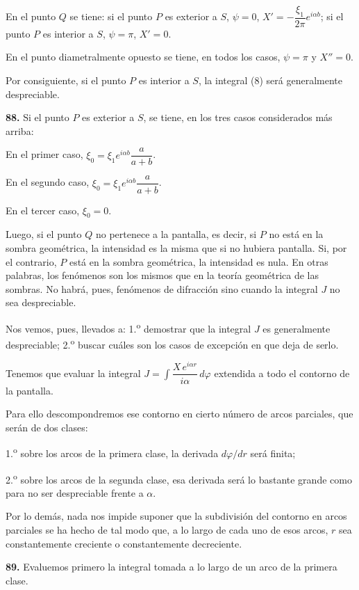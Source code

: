 En el punto $Q$ se tiene: si el punto $P$ es exterior a $S$, $\psi=0$,
$X'=-\dfrac{\xi_1}{2\pi}e^{i\alpha b}$; si el punto $P$ es interior a $S$,
$\psi=\pi$, $X'=0$.

En el punto diametralmente opuesto se tiene, en todos los casos, $\psi=\pi$
y $X''=0$.

Por consiguiente, si el punto $P$ es interior a $S$, la integral (8) será
generalmente despreciable.

\noindent\textbf{88.} Si el punto $P$ es exterior a $S$, se tiene, en los
tres casos considerados más arriba:

En el primer caso, $\xi_0=\xi_1e^{i\alpha b}\dfrac{a}{a+b}$.

En el segundo caso, $\xi_0=\xi_1e^{i\alpha b}\dfrac{a}{a+b}$.

En el tercer caso, $\xi_0=0$.

Luego, si el punto $Q$ no pertenece a la pantalla, es decir, si $P$ no
está en la sombra geométrica, la intensidad es la misma que si no hubiera
pantalla. Si, por el contrario, $P$ está en la sombra geométrica, la
intensidad es nula. En otras palabras, los fenómenos son los mismos que
en la teoría geométrica de las sombras. No habrá, pues, fenómenos de
difracción sino cuando la integral $J$ no sea despreciable.

Nos vemos, pues, llevados a: 1.\textsuperscript{o} demostrar que la integral $J$ es
generalmente despreciable; 2.\textsuperscript{o} buscar cuáles son los casos de
excepción en que deja de serlo.

Tenemos que evaluar la integral
$J=\displaystyle\int \dfrac{X\,e^{i\alpha r}}{i\alpha}\,d\varphi$
extendida a todo el contorno de la pantalla.

Para ello descompondremos ese contorno en cierto número de arcos
parciales, que serán de dos clases:

1.\textsuperscript{o} sobre los arcos de la primera clase, la derivada $d\varphi/dr$
será finita;

2.\textsuperscript{o} sobre los arcos de la segunda clase, esa derivada será lo
bastante grande como para no ser despreciable frente a $\alpha$.

Por lo demás, nada nos impide suponer que la subdivisión del contorno en
arcos parciales se ha hecho de tal modo que, a lo largo de cada uno de
esos arcos, $r$ sea constantemente creciente o constantemente decreciente.

\noindent\textbf{89.} Evaluemos primero la integral tomada a lo largo de
un arco de la primera clase.

